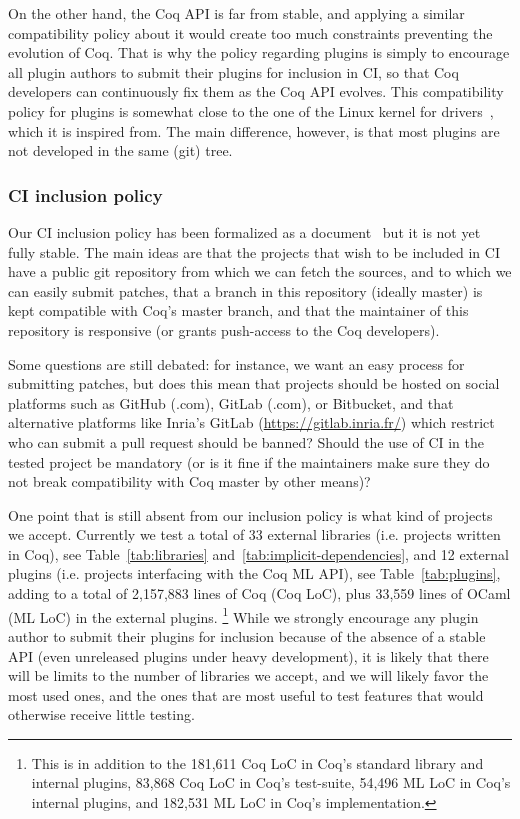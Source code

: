 On the other hand, the Coq API is far from stable, and applying a similar compatibility policy about it would create too much constraints preventing the evolution of Coq.
That is why the policy regarding plugins is simply to encourage all plugin authors to submit their plugins for inclusion in CI, so that Coq developers can continuously fix them as the Coq API evolves.
This compatibility policy for plugins is somewhat close to the one of the Linux kernel for drivers~\cite{kroah_linux_stable_api}, which it is inspired from.
The main difference, however, is that most plugins are not developed in the same (git) tree.

\subsubsection{CI inclusion policy}

Our CI inclusion policy has been formalized as a document~\cite{coq_ci_inclusion_policy} but it is not yet fully stable.
The main ideas are that the projects that wish to be included in CI have a public git repository from which we can fetch the sources, and to which we can easily submit patches, that a branch in this repository (ideally master) is kept compatible with Coq's master branch, and that the maintainer of this repository is responsive (or grants push-access to the Coq developers).

Some questions are still debated: for instance, we want an easy process for submitting patches, but does this mean that projects should be hosted on social platforms such as GitHub (.com), GitLab (.com), or Bitbucket, and that alternative platforms like Inria's GitLab (\url{https://gitlab.inria.fr/}) which restrict who can submit a pull request should be banned?
Should the use of CI in the tested project be mandatory (or is it fine if the maintainers make sure they do not break compatibility with Coq master by other means)?

One point that is still absent from our inclusion policy is what kind of projects we accept.
Currently we test a total of 33 external libraries (i.e. projects written in Coq), see Table~\ref{tab:libraries} and~\ref{tab:implicit-dependencies}, and 12 external plugins (i.e. projects interfacing with the Coq ML API), see Table~\ref{tab:plugins}, adding to a total of 2,157,883 lines of Coq (Coq LoC), plus 33,559 lines of OCaml (ML LoC) in the external plugins.%
\footnote{
	This is in addition to the 181,611 Coq LoC in Coq's standard library and internal plugins, 83,868 Coq LoC in Coq's test-suite, 54,496 ML LoC in Coq's internal plugins, and 182,531 ML LoC in Coq's implementation.
}
While we strongly encourage any plugin author to submit their plugins for inclusion because of the absence of a stable API (even unreleased plugins under heavy development),
it is likely that there will be limits to the number of libraries we accept, and we will likely favor the most used ones, and the ones that are most useful to test features that would otherwise receive little testing.

